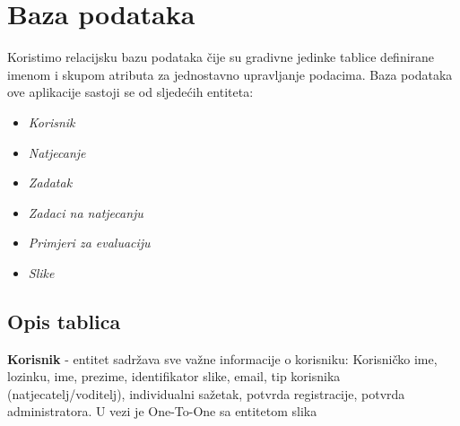 				
		\section{Baza podataka}
			

			
		{Koristimo relacijsku bazu podataka čije su gradivne jedinke tablice definirane imenom i skupom atributa za jednostavno upravljanje podacima. Baza podataka ove aplikacije sastoji se od sljedećih entiteta:}
	\begin{itemize}
		\item 	\textit{Korisnik}
		\item 	\textit{Natjecanje}
		\item 	\textit{Zadatak}
		\item 	\textit{Zadaci na natjecanju}
		\item 	\textit{Primjeri za evaluaciju}	
		\item 	\textit{Slike}		
	\end{itemize}
		
			\subsection{Opis tablica}
			

				{\textbf{Korisnik} - entitet sadržava sve važne informacije o korisniku: Korisničko ime, lozinku, ime, prezime, identifikator slike, email, tip korisnika (natjecatelj/voditelj), individualni sažetak, potvrda registracije, potvrda administratora. U vezi je One-To-One sa entitetom slika }
				
